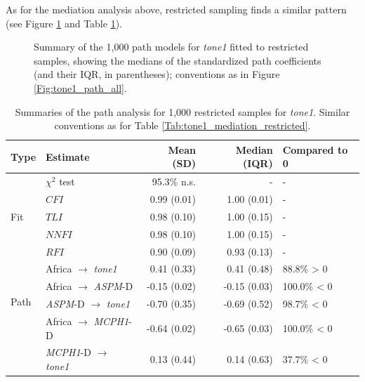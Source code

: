 \documentclass[twoside,onecolumn]{article}
\begin{document}
As for the mediation analysis above, restricted sampling finds a similar pattern (see Figure \ref{Fig:tone1_path_restricted} and Table \ref{Tab:tone1_path_restricted}).

\begin{figure}[h]
  \centering


  \caption{Summary of the 1,000 path models for \textit{tone1} fitted to restricted samples, showing the medians of the standardized path coefficients (and their IQR, in parentheses); conventions as in Figure \ref{Fig:tone1_path_all}. }
  \label{Fig:tone1_path_restricted}
\end{figure}

\begin{table}[h]
  \caption{Summaries of the path analysis for 1,000 restricted samples for \textit{tone1}. Similar conventions as for Table \ref{Tab:tone1_mediation_restricted}.}
  \label{Tab:tone1_path_restricted}
  \centering
  \begin{tabular}{|l|l|r|r|l|}
    \toprule
    \textbf{Type} & \textbf{Estimate} & \textbf{Mean (SD)} & \textbf{Median (IQR)} & \textbf{Compared to 0} \\
    \midrule
    \multirow{5}{*}{Fit} & $\chi^2$ test & 95.3\% n.s. & - & - \\
    & $CFI$              & 0.99 (0.01) & 1.00 (0.01) & - \\
    & $TLI$              & 0.98 (0.10) & 1.00 (0.15) & - \\
    & $NNFI$             & 0.98 (0.10) & 1.00 (0.15) & - \\
    & $RFI$              & 0.90 (0.09) & 0.93 (0.13) & - \\
    \midrule
    \multirow{4}{*}{Path} & Africa $\rightarrow$ \textit{tone1} &  0.41 (0.33) &  0.41 (0.48) & 88.8\%  > 0 \\
    & Africa $\rightarrow$ \textit{ASPM}-D                      & -0.15 (0.02) & -0.15 (0.03) & 100.0\% < 0 \\
    & \textit{ASPM}-D  $\rightarrow$ \textit{tone1}             & -0.70 (0.35) & -0.69 (0.52) & 98.7\%  < 0 \\
    & Africa $\rightarrow$ \textit{MCPH1}-D                     & -0.64 (0.02) & -0.65 (0.03) & 100.0\% < 0 \\
    & \textit{MCPH1}-D $\rightarrow$ \textit{tone1}             &  0.13 (0.44) &  0.14 (0.63) & 37.7\%  < 0 \\
    \bottomrule
  \end{tabular}
\end{table}
\end{document}
